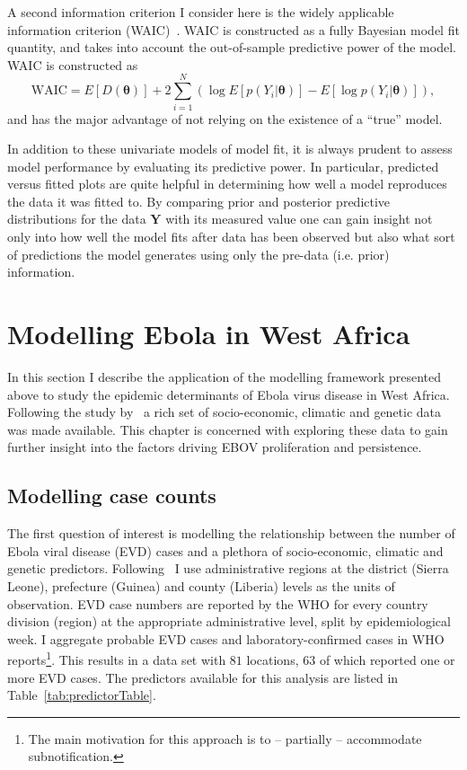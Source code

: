 A second information criterion I consider here is the  widely applicable information criterion (WAIC)~\citep{Watanabe2010}.
WAIC is constructed as a fully Bayesian model fit quantity, and takes into account the out-of-sample predictive power of the model.
WAIC is constructed as 
\[  \text{WAIC} = E[D(\boldsymbol\theta)] + 2\sum_{i=1}^N\left(\log E[p(Y_i | \boldsymbol \theta)] - E[\log p(Y_i | \boldsymbol \theta)] \right),\]
and has the major advantage of not relying on the existence of a ``true'' model.

In addition  to these univariate models of model fit, it is always prudent to assess model performance by evaluating its predictive power.
In particular, predicted versus fitted plots are quite helpful in determining how well a model reproduces the data it was fitted to.
By comparing prior and posterior predictive distributions for the data $\boldsymbol Y$ with its measured value one can gain insight not only into how well the model fits after data has been observed but also what sort of predictions the model generates using only the pre-data (i.e. prior) information.

\section{Modelling Ebola in West Africa}

In this section I describe the application of the modelling framework presented above to study the epidemic determinants of Ebola virus disease in West Africa.
Following the study by~\cite{Dudas2017} a rich set of socio-economic, climatic and genetic data was made available.
This chapter is concerned with exploring these data to gain further insight into the factors driving EBOV proliferation and persistence.

\subsection{Modelling case counts}

The first question of interest is modelling the relationship between the number of Ebola viral disease (EVD) cases and a plethora of socio-economic, climatic and genetic predictors.
Following~\cite{Dudas2017} I use administrative regions at the district (Sierra Leone), prefecture (Guinea) and county (Liberia) levels as the units of observation.
EVD case numbers are reported by the WHO for every country division (region) at the appropriate administrative level, split by epidemiological week.
I aggregate probable EVD cases and laboratory-confirmed cases in WHO reports\footnote{The main motivation for this approach is to -- partially -- accommodate subnotification.}.
This results in a data set with $81$ locations, $63$ of which reported one or more EVD cases.
The predictors available for this analysis are listed in Table~\ref{tab:predictorTable}.

